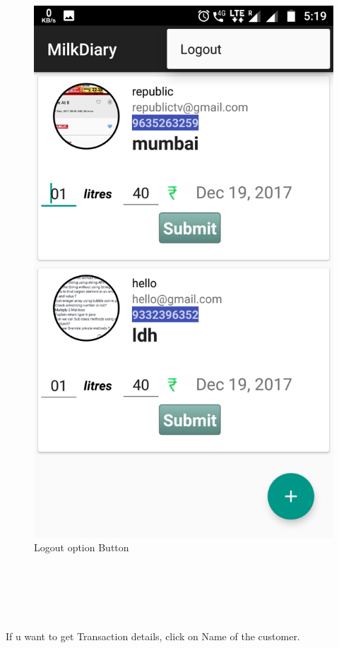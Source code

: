 \begin{figure}[h]
	\centering
	\includegraphics[width=0.7\linewidth]{s09}
	\caption{Logout option Button}
\end{figure}
\begin{text}
	\\
	\\
	\\
	\\
\end{text}
If u want to get Transaction details, click on Name of the customer.
